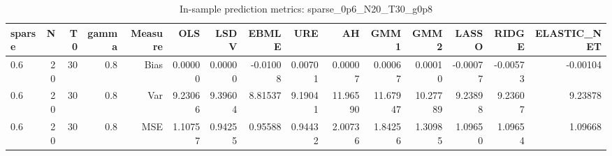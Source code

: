 \begin{table}[!htbp]\centering
\caption{In-sample prediction metrics: sparse_0p6_N20_T30_g0p8}
\label{tab:table2_sparse_0p6_N20_T30_g0p8}
\begin{tabular}{lrrrrrrrrrrrrrr}
\hline
sparse & N & T0 & gamma & Measure & OLS & LSDV & EBMLE & URE & AH & GMM1 & GMM2 & LASSO & RIDGE & ELASTIC_NET \\
\hline
0.6 & 20 & 30 & 0.8 & Bias & 0.00000 & 0.00000 & -0.01008 & 0.00701 & 0.00007 & 0.00067 & 0.00010 & -0.00077 & -0.00573 & -0.00104 \\
0.6 & 20 & 30 & 0.8 & Var & 9.23066 & 9.39604 & 8.81537 & 9.19041 & 11.96590 & 11.67947 & 10.27789 & 9.23898 & 9.23607 & 9.23878 \\
0.6 & 20 & 30 & 0.8 & MSE & 1.10757 & 0.94255 & 0.95588 & 0.94432 & 2.00736 & 1.84256 & 1.30985 & 1.09650 & 1.09654 & 1.09668 \\
\hline
\end{tabular}
\end{table}

